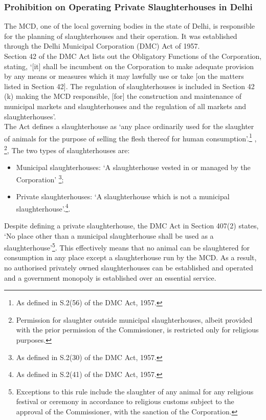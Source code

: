 \documentclass[a4paper, 12pt]{article}
\begin{document}
\subsubsection{Prohibition on Operating Private Slaughterhouses in Delhi}

The MCD, one of the local governing bodies in the state of Delhi, is responsible for the planning of slaughterhouses and their operation. It was established through the Delhi Municipal Corporation (DMC) Act of 1957. \\

Section 42 of the DMC Act lists out the Obligatory Functions of the Corporation, stating, ‘[it] shall be incumbent on the Corporation to make adequate provision by any means or measures which it may lawfully use or take [on the matters listed in Section 42]. The regulation of slaughterhouses is included in Section 42 (k) making the MCD responsible, [for] the construction and maintenance of municipal markets and slaughterhouses and the regulation of all markets and slaughterhouses’.\\

The Act defines a slaughterhouse as ‘any place ordinarily used for the slaughter of animals for the purpose of selling the flesh thereof for human consumption’.\footnote{ As defined in S.2(56) of the DMC Act, 1957.} ,  \footnote{ Permission for slaughter outside municipal slaughterhouses, albeit provided with the prior permission of the Commissioner, is restricted only for religious purposes.}, The two types of slaughterhouses are:\\

\begin{itemize}
\item Municipal slaughterhouses: ‘A slaughterhouse vested in or managed by the Corporation’ \footnote{ As defined in S.2(30) of the DMC Act, 1957.};
\item Private slaughterhouses: ‘A slaughterhouse which is not a municipal slaughterhouse’.\footnote{ As defined in S.2(41) of the DMC Act, 1957.}.\\
\end{itemize}

Despite defining a private slaughterhouse, the DMC Act in Section 407(2) states, ‘No place other than a municipal slaughterhouse shall be used as a slaughterhouse’\footnote{ Exceptions to this rule include the slaughter of any animal for any religious festival or ceremony in accordance to religious customs subject to the approval of the Commissioner, with the sanction of the Corporation.}. This effectively means that no animal can be slaughtered for consumption in any place except a slaughterhouse run by the MCD. As a result, no authorised privately owned slaughterhouses can be established and operated and a government monopoly is established over an essential service. \\
\end{document}
